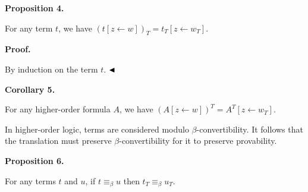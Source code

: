  
 
\par\medskip\noindent\textbf{Proposition 4.}\par
 
 
For any term $t$, we have $(t[z\leftarrow w])_{T}=t_{T}[z\leftarrow w_{T}]$.\par
 
 
 
 
\par\medskip\noindent\textbf{Proof.}\par
 
 
By induction on the term $t$. $\hfill\blacktriangleleft$\par
 
 
 
\par\medskip\noindent\textbf{Corollary 5.}\par
 
 
For any higher-order formula $A$, we have $(A[z\leftarrow w])^{T}=A^{T}[z\leftarrow w_{T}]$.\par
 
 
 
 
In higher-order logic, terms are considered modulo $\beta$-convertibility. It follows that the translation must preserve $\beta$-convertibility for it to preserve provability.\par
 
 
 
\par\medskip\noindent\textbf{Proposition 6.}\par
 
 
For any terms $t$ and $u$, if $t\equiv_{\beta}u$ then $t_{T}\equiv_{\beta}u_{T}$.\par
 
